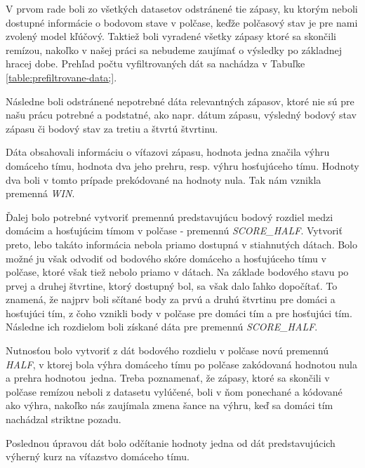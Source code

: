 \documentclass[
  digital, %
  oneside, %
  notable,   %
  lof,     %
  lot,     %
]{fithesis3}
\begin{document}
		V prvom rade boli zo všetkých datasetov odstránené tie zápasy, ku ktorým neboli dostupné informácie o bodovom stave v polčase, keďže polčasový stav je pre nami zvolený model kľúčový. Taktiež boli vyradené všetky zápasy ktoré sa skončili remízou, nakoľko v našej práci sa nebudeme zaujímať o výsledky po základnej hracej dobe. Prehľad počtu vyfiltrovaných dát sa nachádza v Tabuľke \ref{table:prefiltrovane-data;}.
		
		Následne boli odstránené nepotrebné dáta relevantných zápasov, ktoré nie sú pre našu prácu potrebné a podstatné, ako napr. dátum zápasu, výsledný bodový stav zápasu či bodový stav za tretiu a štvrtú štvrtinu.
		
		Dáta obsahovali informáciu o víťazovi zápasu, hodnota jedna značila výhru domáceho tímu, hodnota dva jeho prehru, resp. výhru hosťujúceho tímu. Hodnoty dva boli v tomto prípade prekódované na hodnoty nula. Tak nám vznikla premenná \textit{WIN}.
		
		Ďalej bolo potrebné vytvoriť premennú predstavujúcu bodový rozdiel medzi domácim a hosťujúcim tímom v polčase - premennú \textit{SCORE\_HALF}. Vytvoriť preto, lebo takáto informácia nebola priamo dostupná v stiahnutých dátach. Bolo možné ju však odvodiť od  bodového skóre domáceho a hosťujúceho tímu v polčase, ktoré však tiež nebolo priamo v dátach. Na základe bodového stavu po prvej a druhej štvrtine, ktorý dostupný bol, sa však dalo ľahko dopočítať. To znamená, že najprv boli sčítané body za prvú a druhú štvrtinu pre domáci a hosťujúci tím, z čoho vznikli body v polčase pre domáci tím a pre hosťujúci tím. Následne ich rozdielom boli získané dáta pre premennú \textit{SCORE\_HALF}. 
		
		Nutnosťou bolo vytvoriť z dát bodového rozdielu v polčase novú premennú \textit{HALF}, v ktorej bola výhra domáceho tímu po polčase zakódovaná hodnotou nula a prehra hodnotou~jedna. Treba poznamenať, že zápasy, ktoré sa skončili v polčase remízou neboli z datasetu vylúčené, boli v ňom ponechané a kódované ako výhra, nakoľko nás zaujímala zmena šance na výhru, keď sa domáci tím nachádzal striktne pozadu.
		
		Poslednou úpravou dát bolo odčítanie hodnoty jedna od dát predstavujúcich výherný kurz na víťazstvo domáceho tímu.
	
\end{document}
